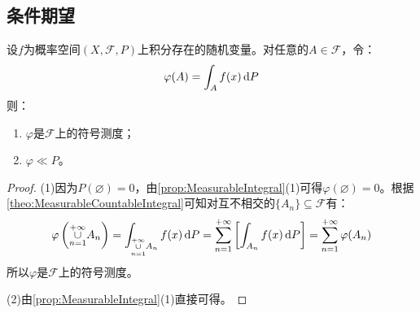 \subsection{条件期望}
\begin{lemma}\label{lem:ConditionalExpectation}
	设$f$为概率空间$(X,\mathscr{F},P)$上积分存在的随机变量。对任意的$A\in\mathscr{F}$，令：
	\begin{equation*}
		\varphi(A)=\int_{A}f(x)\mathop{}\!\mathrm{d} P
	\end{equation*}
	则：
	\begin{enumerate}
		\item $\varphi$是$\mathscr{F}$上的符号测度；
		\item $\varphi\ll P$。
	\end{enumerate}
\end{lemma}
\begin{proof}
	(1)因为$P(\varnothing)=0$，由\cref{prop:MeasurableIntegral}(1)可得$\varphi(\varnothing)=0$。根据\cref{theo:MeasurableCountableIntegral}可知对互不相交的$\{A_n\}\subseteq\mathscr{F}$有：
	\begin{equation*}
		\varphi\left(\underset{n=1}{\overset{+\infty}{\cup}}A_n\right)=\int_{\underset{n=1}{\overset{+\infty}{\cup}}A_n}f(x)\mathop{}\!\mathrm{d} P=\sum_{n=1}^{+\infty}\left[\int_{A_n}f(x)\mathop{}\!\mathrm{d} P\right]=\sum_{n=1}^{+\infty}\varphi(A_n)
	\end{equation*}
	所以$\varphi$是$\mathscr{F}$上的符号测度。\par
	(2)由\cref{prop:MeasurableIntegral}(1)直接可得。
\end{proof}

